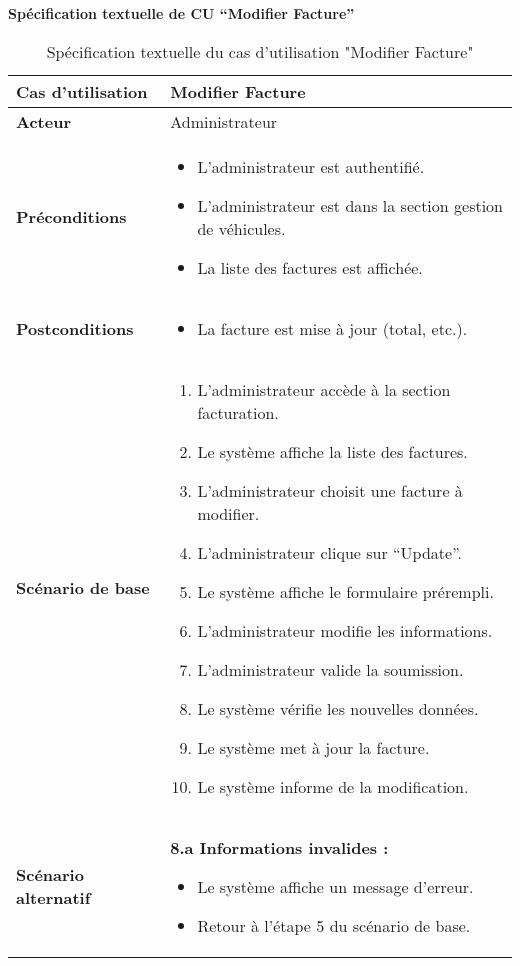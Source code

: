 \documentclass[a4paper,11pt]{report}
\begin{document}
\newpage
\textbf{Spécification textuelle de CU “Modifier Facture”}
\begin{table}[H]
  \centering
  \renewcommand{\arraystretch}{1.5}
  \caption{Spécification textuelle du cas d'utilisation "Modifier Facture"}
  \begin{tabularx}{\textwidth}{|l|X|}
    \hline
    \textbf{Cas d'utilisation} & Modifier Facture \\ \hline
    \textbf{Acteur}            & Administrateur \\ \hline
    \textbf{Préconditions}     & 
      \begin{itemize}
        \item L’administrateur est authentifié.
        \item L'administrateur est dans la section gestion de véhicules.
        \item La liste des factures est affichée.
      \end{itemize} \\ \hline
    \textbf{Postconditions}    & 
      \begin{itemize}
        \item La facture est mise à jour (total, etc.).
      \end{itemize} \\ \hline
    \textbf{Scénario de base}  & 
      \begin{enumerate}
        \item L’administrateur accède à la section facturation.
        \item Le système affiche la liste des factures.
        \item L'administrateur choisit une facture à modifier.
        \item L'administrateur clique sur “Update”.
        \item Le système affiche le formulaire prérempli.
        \item L'administrateur modifie les informations.
        \item L'administrateur valide la soumission.
        \item Le système vérifie les nouvelles données.
        \item Le système met à jour la facture.
        \item Le système informe de la modification.
      \end{enumerate} \\ \hline
    \textbf{Scénario alternatif} & 
      \textbf{8.a Informations invalides :}
      \begin{itemize}
        \item Le système affiche un message d’erreur.
        \item Retour à l’étape 5 du scénario de base.
      \end{itemize} \\ \hline
  \end{tabularx}
\end{table}
\end{document}
